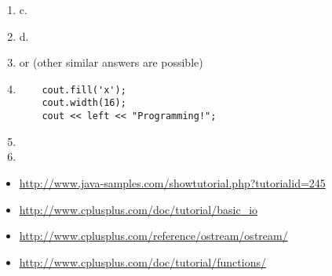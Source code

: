 \begin{enumerate}
	\item c.
	\item d.
	\item {} or  (other similar answers are possible)
	\item
	\begin{lstlisting}
	cout.fill('x');
	cout.width(16);
	cout << left << "Programming!";
	\end{lstlisting}
	\item {}
	\item {}
\end{enumerate}



\begin{itemize}
\item \url{http://www.java-samples.com/showtutorial.php?tutorialid=245}
\item \url{http://www.cplusplus.com/doc/tutorial/basic_io}
\item \url{http://www.cplusplus.com/reference/ostream/ostream/}
\item \url{http://www.cplusplus.com/doc/tutorial/functions/}
\end{itemize}	

